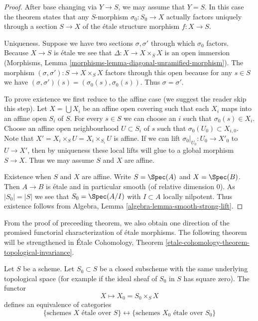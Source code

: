\begin{proof}
After base changing via $Y \to S$, we may assume that $Y = S$.
In this case the theorem states that any $S$-morphism $\sigma_0 : S_0 \to X$
actually factors uniquely through a section $S \to X$ of the
\'etale structure morphism $f : X \to S$.

\medskip\noindent
Uniqueness. Suppose we have two sections $\sigma, \sigma'$
through which $\sigma_0$ factors. Because $X \to S$ is \'etale
we see that $\Delta : X \to X \times_S X$ is an open immersion
(Morphisms, Lemma \ref{morphisms-lemma-diagonal-unramified-morphism}).
The morphism $(\sigma, \sigma') : S \to X \times_S X$ factors
through this open because for any $s \in S$ we have
$(\sigma, \sigma')(s) = (\sigma_0(s), \sigma_0(s))$. Thus
$\sigma = \sigma'$.

\medskip\noindent
To prove existence we first reduce to the affine case
(we suggest the reader skip this step).
Let $X = \bigcup X_i$ be an affine open covering such
that each $X_i$ maps into an affine open $S_i$ of $S$.
For every $s \in S$ we can choose an $i$ such that
$\sigma_0(s) \in X_i$.
Choose an affine open neighbourhood $U \subset S_i$ of $s$
such that $\sigma_0(U_0) \subset X_{i, 0}$. Note that
$X' = X_i \times_S U = X_i \times_{S_i} U$ is affine.
If we can lift $\sigma_0|_{U_0} : U_0 \to X'_0$ to
$U \to X'$, then by uniqueness these local lifts will glue
to a global morphism $S \to X$. Thus we may assume $S$ and
$X$ are affine.

\medskip\noindent
Existence when $S$ and $X$ are affine. Write $S = \Spec(A)$
and $X = \Spec(B)$. Then $A \to B$ is \'etale and in particular
smooth (of relative dimension $0$). As $|S_0| = |S|$ we see
that $S_0 = \Spec(A/I)$ with $I \subset A$ locally nilpotent.
Thus existence follows from
Algebra, Lemma \ref{algebra-lemma-smooth-strong-lift}.
\end{proof}

\noindent
From the proof of preceeding theorem, we also obtain one direction of the
promised functorial characterization of \'etale morphisms. The following
theorem will be strengthened in
\'Etale Cohomology,
Theorem \ref{etale-cohomology-theorem-topological-invariance}.

\begin{theorem}
\label{theorem-remarkable-equivalence}
\begin{reference}
\cite[IV, Theorem 18.1.2]{EGA}
\end{reference}
Let $S$ be a scheme.
Let $S_0 \subset S$ be a closed subscheme with the same underlying
topological space (for example if the ideal sheaf of $S_0$ in $S$
has square zero). The functor
$$
X \longmapsto X_0 = S_0 \times_S X
$$
defines an equivalence of categories
$$
\{
\text{schemes }X\text{ \'etale over }S
\}
\leftrightarrow
\{
\text{schemes }X_0\text{ \'etale over }S_0
\}
$$
\end{theorem}

